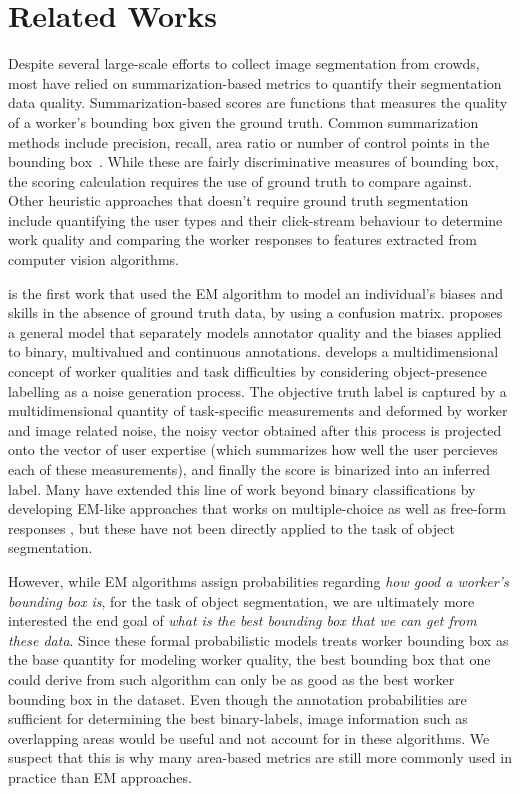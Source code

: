 \documentclass[letterpaper]{article} %
\begin{document}
\section{Related Works}
\par Despite several large-scale efforts to collect image segmentation from crowds\cite{Lin2014,MartinFTM01,Torralba2010,pascal-voc-2012}, most have relied on summarization-based metrics to quantify their segmentation data quality. Summarization-based scores are functions that measures the quality of a worker's bounding box given the ground truth. Common summarization methods include precision, recall, area ratio or number of control points in the bounding box~\cite{Vittayakorn2011}. While these are fairly discriminative measures of bounding box, the scoring calculation requires the use of ground truth to compare against. Other heuristic approaches that doesn't require ground truth segmentation include quantifying the user types and their click-stream behaviour to determine work quality\cite{Cabezas2015,Sameki2015} and comparing the worker responses to features extracted from computer vision algorithms\cite{Vittayakorn2011,Russakovsky2015}.
\par \cite{Dawid1979} is the first work that used the EM algorithm to model an individual's biases and skills in the absence of ground truth data, by using a confusion matrix. \cite{OCWelinder2010} proposes a general model that separately models annotator quality and the biases applied to binary, multivalued and continuous annotations. \cite{MDWWelinder2010} develops a multidimensional concept of worker qualities and task difficulties by considering object-presence labelling as a noise generation process. The objective truth label is captured by a multidimensional quantity of task-specific measurements and deformed by worker and image related noise, the noisy vector obtained after this process is projected onto the vector of user expertise (which summarizes how well the user percieves each of these measurements), and finally the score is binarized into an inferred label. Many have extended this line of work beyond binary classifications by developing EM-like approaches that works on multiple-choice \cite{Karger2013} as well as free-form responses \cite{Lin2012}, but these have not been directly applied to the task of object segmentation.
\par However, while EM algorithms assign probabilities regarding  \textit{how good a worker's bounding box is}, for the task of object segmentation, we are ultimately more interested the end goal of \textit{what is the best bounding box that we can get from these data}. Since these formal probabilistic models treats worker bounding box as the base quantity for modeling worker quality, the best bounding box that one could derive from such algorithm can only be as good as the best worker bounding box in the dataset.  Even though the annotation probabilities are sufficient for determining the best binary-labels, image information such as overlapping areas would be useful and not account for in these algorithms. We suspect that this is why many area-based metrics are still more commonly used in practice than EM approaches.
\end{document}
